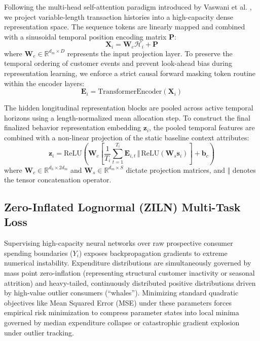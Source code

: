 \documentclass[10pt, conference]{IEEEtran}
\begin{document}
Following the multi-head self-attention paradigm introduced by Vaswani et al. \cite{Vaswani2017}, we project variable-length transaction histories into a high-capacity dense representation space. The sequence tokens are linearly mapped and combined with a sinusoidal temporal position encoding matrix $\mathbf{P}$:
\begin{equation}
\mathbf{\mathbf{X}}_i = \mathbf{W}_e \mathcal{H}_i + \mathbf{P}
\end{equation}
where $\mathbf{W}_e \in \mathbb{R}^{d_{m} \times D}$ represents the input projection layer. To preserve the temporal ordering of customer events and prevent look-ahead bias during representation learning, we enforce a strict causal forward masking token routine within the encoder layers:
\begin{equation}
\mathbf{E}_i = \text{TransformerEncoder}\left( \mathbf{\mathbf{X}}_i \right)
\end{equation}

The hidden longitudinal representation blocks are pooled across active temporal horizons using a length-normalized mean allocation step. To construct the final finalized behavior representation embedding $\mathbf{z}_i$, the pooled temporal features are combined with a non-linear projection of the static baseline context attributes:
\begin{equation}
\mathbf{z}_i = \text{ReLU}\left( \mathbf{W}_c \left[ \frac{1}{T_i}\sum_{t=1}^{T_i} \mathbf{E}_{i,t} \, \Vert \, \text{ReLU}(\mathbf{W}_s \mathbf{s}_i) \right] + \mathbf{b}_c \right)
\end{equation}
where $\mathbf{W}_c \in \mathbb{R}^{d_{h} \times 2d_{m}}$ and $\mathbf{W}_s \in \mathbb{R}^{d_{m} \times S}$ dictate projection matrices, and $\Vert$ denotes the tensor concatenation operator.

\subsection{Zero-Inflated Lognormal (ZILN) Multi-Task Loss}
Supervising high-capacity neural networks over raw prospective consumer spending boundaries ($Y_i$) exposes backpropagation gradients to extreme numerical instability. Expenditure distributions are simultaneously governed by mass point zero-inflation (representing structural customer inactivity or seasonal attrition) and heavy-tailed, continuously distributed positive distributions driven by high-value outlier consumers (``whales''). Minimizing standard quadratic objectives like Mean Squared Error (MSE) under these parameters forces empirical risk minimization to compress parameter states into local minima governed by median expenditure collapse or catastrophic gradient explosion under outlier tracking.
\end{document}
